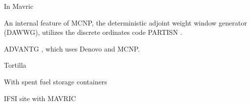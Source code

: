 In Mavric \cite{peplow_advanced_2007}

An internal feature of MCNP, the deterministic adjoint weight window generator (DAWWG), utilizes the discrete ordinates code PARTISN \cite{sweezy_automated_2005}. 

ADVANTG \cite{mosher_new_2010, wagner_review_2011, bevill_new_2012}, which uses Denovo \cite{evans_denovo:_2010-1} and MCNP. 

Tortilla \cite{somasundaram_implementation_2013}

With spent fuel storage containers \cite{chen_surface_2011}

IFSI site with MAVRIC \cite{sheu_dose_2011}



